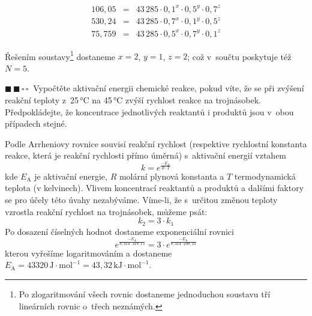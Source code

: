 \documentclass{book}
\newcommand{\dva}{$\blacksquare \, \blacksquare \, \square \, \square \; \; $}
\renewenvironment{quotation}{\par}{\par} %
\begin{document}
\[
\begin{array}{ccc}
106,05 & = & 43\,285\cdot 0,1^{x}\cdot0,5^{y}\cdot0,7^{z}\\
530,24 & = & 43\,285\cdot 0,7^{x}\cdot0,1^{y}\cdot0,5^{z}\\
75,759 & = & 43\,285\cdot 0,5^{x}\cdot0,7^{y}\cdot0,1^{z}
\end{array}
\]

Řešením soustavy\footnote{Po zlogaritmování všech rovnic dostaneme jednoduchou soustavu tří lineárních rovnic o~třech neznámých.} dostaneme $x=2$, $y=1$, $z=2$; což v~součtu poskytuje
též $N=5$.

\hrulefill %
\begin{quotation}
\dva Vypočtěte aktivační energii chemické reakce, pokud víte, že se při
zvýšení reakční teploty z~25\,°C na 45\,°C zvýší rychlost reakce na
trojnásobek. Předpokládejte, že koncentrace jednotlivých reaktantů
i produktů jsou v~obou případech stejné. 
\end{quotation} \dotfill \par 
Podle Arrheniovy rovnice souvisí reakční rychlost (respektive rychlostní konstanta reakce, která je reakční rychlosti přímo úměrná) s~aktivační energií
vztahem
\[
k=e^{\frac{-E_{A}}{R\cdot T}}
\]
kde $E_{\mathrm{A}}$ je aktivační
energie, $R$ molární plynová konstanta a $T$ termodynamická teplota
(v kelvinech). Vlivem koncentrací reaktantů a produktů a dalšími faktory
se pro účely této úvahy nezabýváme. Víme-li, že s~určitou změnou teploty
vzrostla reakční rychlost na trojnásobek, můžeme psát:
\[
k_{2}=3\cdot k_{1}
\]
Po dosazení číselných hodnot dostaneme exponenciální
rovnici 
\[
e^{\frac{-E_{\mathrm{A}}}{8,314\cdot318,15}}=3\cdot e^{\frac{-E_{\mathrm{A}}}{8,314\cdot298,15}}
\]
kterou vyřešíme logaritmováním a dostaneme $E_{\mathrm{A}}=43320\, \mathrm{J\cdot mol^{-1}}=43,32\, \mathrm{kJ\cdot mol^{-1}}$. 
\end{document}
